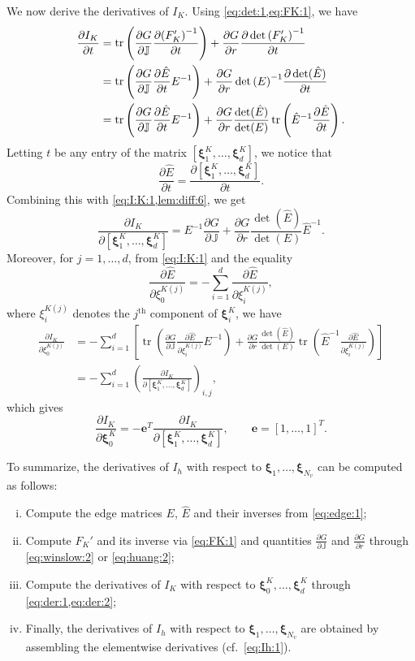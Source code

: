 \documentclass[american]{scrartcl}
\providecommand{\V}[1]{\boldsymbol{#1}}
\providecommand{\p}[2]{\frac{\partial{}#1}{\partial{}#2}}
\providecommand{\J}{\mathbb{J}}
\theoremstyle{remark}
\begin{document}
We now derive the derivatives of $I_K$.
Using \cref{eq:det:1,eq:FK:1}, we have
\begin{align}
   \p{I_K}{t} 
      &= \operatorname{tr}\left( \p{G}{\J} \p{{(F_K')}^{-1}}{t} \right)
         + \p{G}{r} \p{\det{(F_K')}^{-1}}{t}
\notag  \\
      &= \operatorname{tr}\left( \p{G}{\J} \p{\hat{E}}{t} E^{-1} \right)
         + \p{G}{r} \det{(E)}^{-1} \p{\det(\hat{E})}{t}
 \notag  \\
      &= \operatorname{tr}\left( \p{G}{\J} \p{\hat{E}}{t} E^{-1} \right)
         + \p{G}{r} \frac{\det(\hat{E})}{\det(E)} 
            \operatorname{tr}\left( \hat{E}^{-1} \p{\hat{E}}{t} \right) .
   \label{eq:I:K:1}
\end{align}
Letting $t$ be any entry of the matrix $[\V{\xi}_1^K, \dotsc, \V{\xi}_d^K]$, we notice that
\[
   \p{\hat{E}}{t} = \p{[\V{\xi}_1^K,\dotsc,\V{\xi}_d^K]}{t} .
\]
Combining this with \cref{eq:I:K:1,lem:diff:6}, we get
\begin{equation}
   \p{I_K}{[\V{\xi}_1^K,\dotsc,\V{\xi}_d^K]} 
      = E^{-1} \p{G}{\J} + \p{G}{r} \frac{\det(\hat{E})}{\det(E)} \hat{E}^{-1} .
   \label{eq:der:1}
\end{equation}
Moreover, for $j = 1, \dotsc, d$, from \cref{eq:I:K:1} and the equality
\[
   \p{\hat{E}}{\xi_{0}^{K (j)}} = - \sum_{i=1}^d \p{\hat{E}}{\xi_{i}^{K (j)}},
\]
where $\xi_{i}^{K (j)}$ denotes the $j^{\text{th}}$ component of $\V{\xi}_i^K$, we have
\begin{align*}
   \p{I_K}{\xi_{0}^{K (j)}} 
   &= - \sum_{i=1}^d
      \left[ 
         \operatorname{tr}\left( \p{G}{\J} \p{\hat{E}}{\xi_{i}^{K (j)}} E^{-1} \right)
            + \p{G}{r} \frac{\det(\hat{E})}{\det(E)} 
            \operatorname{tr}\left( \hat{E}^{-1} \p{\hat{E}}{\xi_{i}^{K (j)}} \right)
      \right]
   \\
   &= - \sum_{i=1}^d {\left(\p{I_K}{[\V{\xi}_1^K,\dotsc,\V{\xi}_d^K]}\right)}_{i,j} ,
\end{align*}
which gives
\begin{equation}
   \p{I_K}{\V{\xi}_0^K} 
      = - \V{e}^T \p{I_K}{[\V{\xi}_1^K,\dotsc,\V{\xi}_d^K]}
   ,
   \qquad
   \V{e} = {[1, \dotsc, 1]}^T
   . 
   \label{eq:der:2}
\end{equation}

To summarize, the derivatives of $I_h$ with respect to $\V{\xi}_{1},\dotsc,\V{\xi}_{N_v}$ can be computed as follows:
\begin{enumerate}[(i)]
   \item Compute the edge matrices $E$, $\hat{E}$ and their inverses from \cref{eq:edge:1};
   \item Compute $F_K'$ and its inverse via \cref{eq:FK:1} and quantities $\p{G}{\J}$ and $\p{G}{r}$ through \cref{eq:winslow:2} or \cref{eq:huang:2};
   \item Compute the derivatives of $I_K$ with respect to $\V{\xi}_{0}^K,\dotsc,\V{\xi}_{d}^K$ through \cref{eq:der:1,eq:der:2};
   \item Finally, the derivatives of $I_h$ with respect to $\V{\xi}_{1},\dotsc,\V{\xi}_{N_v}$ are obtained by assembling the elementwise derivatives (cf.~\cref{eq:Ih:1}).
\end{enumerate}
\end{document}
